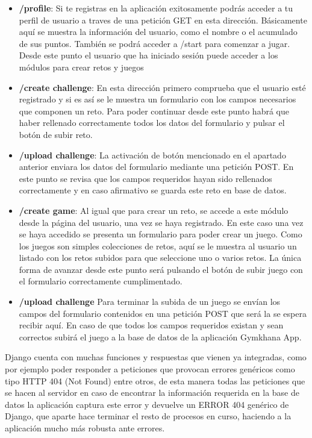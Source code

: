 \documentclass[a4paper, 12pt]{book}
\begin{document}
\begin{itemize}
	\item \textbf {/profile}: Si te registras en la aplicación exitosamente podrás acceder a tu perfil de usuario a traves de una petición GET en esta dirección. Básicamente aquí se muestra la información del usuario, como el nombre o el acumulado de sus puntos. También se podrá acceder a /start para comenzar a jugar. Desde este punto el usuario que ha iniciado sesión puede acceder a los módulos para crear retos y juegos 
	\item \textbf {/create challenge}: En esta dirección primero comprueba que el usuario esté registrado y si es así se le muestra un formulario con los campos necesarios que componen un reto. Para poder continuar desde este punto habrá que haber rellenado correctamente todos los datos del formulario y pulsar el botón de subir reto. 
	\item \textbf {/upload challenge}: La activación de botón mencionado en el apartado anterior enviara los datos del formulario mediante una petición POST. En este punto se revisa que los campos requeridos hayan sido rellenados correctamente y en caso afirmativo se guarda este reto en base de datos.  
	\item \textbf {/create game}: Al igual que para crear un reto, se accede a este módulo desde la página del usuario, una vez se haya registrado. En este caso una vez se haya accedido se presenta un formulario para poder crear un juego. Como los juegos son simples colecciones de retos, aquí se le muestra al usuario un listado con los retos subidos para que seleccione uno o varios retos. La única forma de avanzar desde este punto será pulsando el botón de subir juego con el formulario correctamente cumplimentado. 
	\item \textbf {/upload challenge} Para terminar la subida de un juego se envían los campos del formulario contenidos en una petición POST que será la se espera recibir aquí. En caso de que todos los campos requeridos existan y sean correctos subirá el juego a la base de datos de la aplicación Gymkhana App.
	
\end{itemize}

Django cuenta con muchas funciones y respuestas que vienen ya integradas, como por ejemplo poder responder a peticiones que provocan errores genéricos como tipo HTTP 404 (Not Found) entre otros, de esta manera todas las peticiones que se hacen al servidor en caso de encontrar la información requerida en la base de datos la aplicación captura este error y devuelve un ERROR 404 genérico de Django, que aparte hace terminar el resto de procesos en curso, haciendo a la aplicación mucho más robusta ante errores. 
\end{document}
